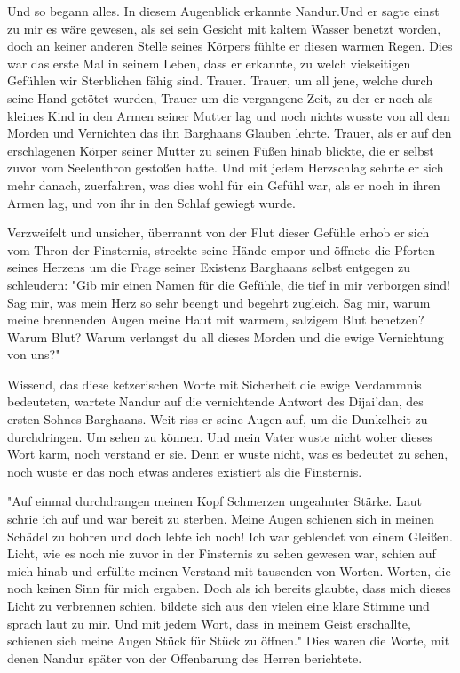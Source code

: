 \documentclass[10pt,twoside,BCOR=12mm,DIV=classic]{scrbook}
\begin{document}
Und so begann alles. In diesem Augenblick erkannte Nandur.Und er sagte einst zu
mir es wäre gewesen, als sei sein Gesicht mit kaltem Wasser benetzt worden, doch
an keiner anderen Stelle seines Körpers fühlte er diesen warmen Regen. Dies war
das erste Mal in seinem Leben, dass er erkannte, zu welch vielseitigen Gefühlen
wir Sterblichen fähig sind. Trauer. Trauer, um all jene, welche durch seine Hand
getötet wurden, Trauer um die vergangene Zeit, zu der er noch als kleines Kind
in den Armen seiner Mutter lag und noch nichts wusste von all dem Morden und
Vernichten das ihn Barghaans Glauben lehrte. Trauer, als er auf den erschlagenen
Körper seiner Mutter zu seinen Füßen hinab blickte, die er selbst zuvor vom
Seelenthron gestoßen hatte.
Und mit jedem Herzschlag sehnte er sich mehr danach, zuerfahren, was dies wohl
für ein Gefühl war, als er noch in ihren Armen lag, und von ihr in den Schlaf
gewiegt wurde.

Verzweifelt und unsicher, überrannt von der Flut dieser Gefühle erhob er sich
vom Thron der Finsternis, streckte seine Hände empor und öffnete die Pforten
seines Herzens um die Frage seiner Existenz Barghaans selbst entgegen zu
schleudern: "Gib mir einen Namen für die Gefühle, die tief in mir verborgen
sind! Sag mir, was mein Herz so sehr beengt und begehrt zugleich. Sag mir, warum
meine brennenden Augen meine Haut mit warmem, salzigem Blut benetzen? Warum
Blut? Warum verlangst du all dieses Morden und die ewige Vernichtung von uns?"

Wissend, das diese ketzerischen Worte mit Sicherheit die ewige Verdammnis
bedeuteten, wartete Nandur auf die vernichtende Antwort des Dijai'dan, des
ersten Sohnes Barghaans. Weit riss er seine Augen auf, um die Dunkelheit zu
durchdringen. Um sehen zu können. Und mein Vater wuste nicht woher dieses Wort
karm, noch verstand er sie. Denn er wuste nicht, was es bedeutet zu sehen, noch
wuste er das noch etwas anderes existiert als die Finsternis.

"Auf einmal durchdrangen meinen Kopf Schmerzen ungeahnter Stärke. Laut schrie
ich auf und war bereit zu sterben. Meine Augen schienen sich in meinen Schädel
zu bohren und doch lebte ich noch! Ich war geblendet von einem Gleißen. Licht,
wie es noch nie zuvor in der Finsternis zu sehen gewesen war, schien auf mich
hinab und erfüllte meinen Verstand mit tausenden von Worten. Worten, die noch
keinen Sinn für mich ergaben. Doch als ich bereits glaubte, dass mich dieses
Licht zu verbrennen schien, bildete sich aus den vielen eine klare Stimme und
sprach laut zu mir. Und mit jedem Wort, dass in meinem Geist erschallte,
schienen sich meine Augen Stück für Stück zu öffnen." Dies waren die Worte, mit
denen Nandur später von der Offenbarung des Herren berichtete.
\end{document}
